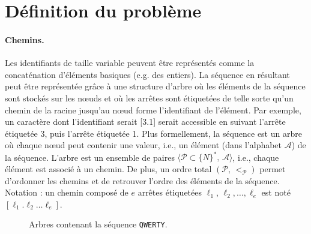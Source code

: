 
\section{Définition du problème}
\label{repl:sec:problem}

\paragraph{Chemins.}

Les identifiants de taille variable peuvent être représentés comme la
concaténation d'éléments basiques (e.g. des entiers). La séquence en résultant
peut être représentée grâce à une structure d'arbre où les éléments de la
séquence sont stockés sur les nœuds et où les arrêtes sont étiquetées de telle
sorte qu'un chemin de la racine jusqu'au nœud forme l'identifiant de
l'élément. Par exemple, un caractère dont l'identifiant serait [3.1] serait
accessible en suivant l'arrête étiquetée 3, puis l'arrête étiquetée 1. Plus
formellement, la séquence est un arbre où chaque nœud peut contenir une valeur,
i.e., un élément (dans l'alphabet $\mathcal{A}$) de la séquence. L'arbre est un
ensemble de paires $\langle \mathcal{P}\subset \{N\}^*,\, \mathcal{A} \rangle$,
i.e., chaque élément est associé à un chemin. De plus, un ordre total
$(\mathcal{P},\, <_\mathcal{P})$ permet d'ordonner les chemins et de retrouver
l'ordre des éléments de la séquence. Notation : un chemin composé de $e$ arrêtes
étiquetées $\ell_1,\,\ell_2,\ldots,\ell_e$ est noté
$[\ell_1.\ell_2\ldots\ell_e]$.

\begin{figure}
  \centering
  \hspace{20pt}
  \caption[Arbres contenant une séquence répliquée]
  {Arbres contenant la séquence \texttt{QWERTY}.}
\end{figure}

